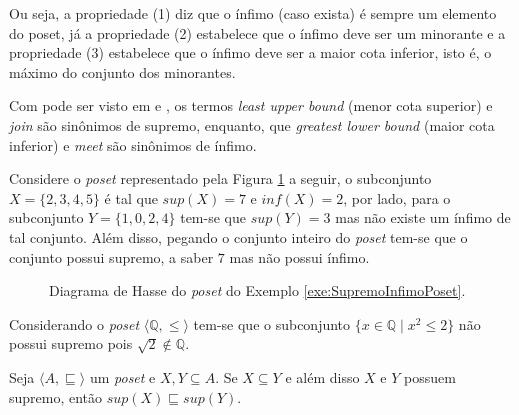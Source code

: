 Ou seja, a propriedade (1) diz que o ínfimo (caso exista) é sempre um elemento do poset, já a propriedade (2) estabelece que o  ínfimo deve ser um minorante e a propriedade (3) estabelece que o  ínfimo deve ser a maior cota inferior, isto é, o máximo do conjunto dos minorantes.

\begin{atencao}
  Com pode ser visto em \cite{carmo2013} e \cite{fmcbook}, os termos \textit{least upper bound} (menor cota superior) e \textit{join} são sinônimos de supremo, enquanto, que \textit{greatest lower bound} (maior cota inferior) e \textit{meet} são sinônimos de ínfimo.
\end{atencao}

\begin{exemplo}\label{exe:SupremoInfimoPoset}
	Considere o \textit{poset} representado pela Figura \ref{fig:DiagramaHasse10} a seguir, o subconjunto $X = \{2, 3, 4, 5\}$ é tal que $sup(X) = 7$ e $inf(X) = 2$, por lado, para o subconjunto $Y = \{1, 0, 2, 4\}$ tem-se que $sup(Y) = 3$ mas não existe um ínfimo de tal conjunto. Além disso, pegando o conjunto inteiro do \textit{poset} tem-se que o conjunto possui supremo, a saber $7$ mas não possui ínfimo. 
\end{exemplo}

\begin{figure}[h]
  \centering
  \caption{Diagrama de Hasse do \textit{poset} do Exemplo \ref{exe:SupremoInfimoPoset}.}
  \label{fig:DiagramaHasse10}
\end{figure}

\begin{exemplo}
  Considerando o \textit{poset} $\langle \mathbb{Q}, \leq \rangle$ tem-se que o subconjunto $\{x \in \mathbb{Q} \mid x^2 \leq 2\}$ não possui supremo pois $\sqrt{2} \notin \mathbb{Q}$.
\end{exemplo}

\begin{teorema}
	Seja $\langle A, \sqsubseteq \rangle$ um \textit{poset} e $X, Y \subseteq A$. Se $X \subseteq Y$ e além disso $X$ e $Y$ possuem supremo, então $sup(X) \sqsubseteq sup(Y)$.
\end{teorema}

